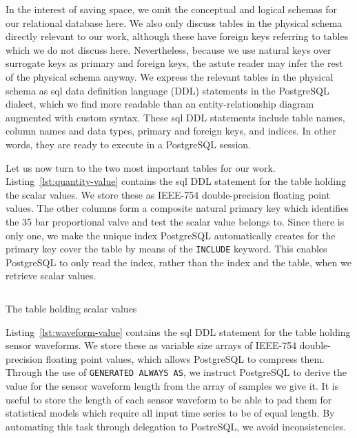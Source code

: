 In the interest of saving space, we omit the conceptual and logical schemas for our relational database here.
We also only discuss tables in the physical schema directly relevant to our work, although these have foreign keys referring to tables which we do not discuss here.
Nevertheless, because we use natural keys over surrogate keys as primary and foreign keys, the astute reader may infer the rest of the physical schema anyway.
We express the relevant tables in the physical schema as \acrshort{sql} data definition language (DDL) statements in the PostgreSQL dialect, which we find more readable than an entity-relationship diagram augmented with custom syntax.
These \acrshort{sql} DDL statements include table names, column names and data types, primary and foreign keys, and indices.
In other words, they are ready to execute in a PostgreSQL session.

Let us now turn to the two most important tables for our work.
Listing~\ref{lst:quantity-value} contains the \acrshort{sql} DDL statement for the table holding the scalar values.
We store these as IEEE-754 double-precision floating point values.
The other columns form a composite natural primary key which identifies the 35 bar proportional valve and test the scalar value belongs to.
Since there is only one, we make the unique index PostgreSQL automatically creates for the primary key cover the table by means of the \texttt{INCLUDE} keyword.
This enables PostgreSQL to only read the index, rather than the index and the table, when we retrieve scalar values.

\begin{listing}
  \inputminted[firstline=198,lastline=252,breaklines=true]{postgresql}{schema.sql}
  \caption{The table holding scalar values}
  \label{lst:quantity-value}
\end{listing}

Listing~\ref{lst:waveform-value} contains the \acrshort{sql} DDL statement for the table holding sensor waveforms.
We store these as variable size arrays of IEEE-754 double-precision floating point values, which allows PostgreSQL to compress them.
Through the use of \texttt{GENERATED ALWAYS AS}, we instruct PostgreSQL to derive the value for the sensor waveform length from the array of samples we give it.
It is useful to store the length of each sensor waveform to be able to pad them for statistical models which require all input time series to be of equal length.
By automating this task through delegation to PostreSQL, we avoid inconsistencies.

